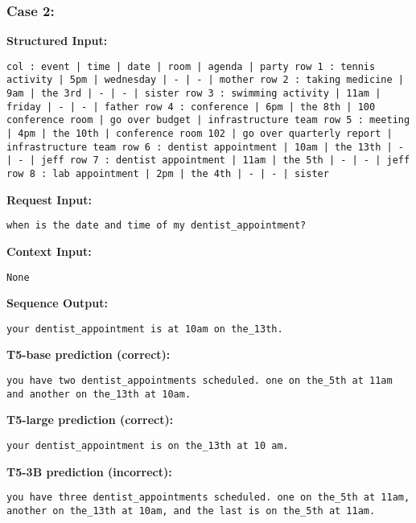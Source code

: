 \documentclass[11pt]{article}
\begin{document}
\subsubsection{Case 2:}
\label{app:kvret_case2}
\textbf{Structured Input:} 
\begin{lstlisting}
col : event | time | date | room | agenda | party row 1 : tennis activity | 5pm | wednesday | - | - | mother row 2 : taking medicine | 9am | the 3rd | - | - | sister row 3 : swimming activity | 11am | friday | - | - | father row 4 : conference | 6pm | the 8th | 100 conference room | go over budget | infrastructure team row 5 : meeting | 4pm | the 10th | conference room 102 | go over quarterly report | infrastructure team row 6 : dentist appointment | 10am | the 13th | - | - | jeff row 7 : dentist appointment | 11am | the 5th | - | - | jeff row 8 : lab appointment | 2pm | the 4th | - | - | sister
\end{lstlisting}
\textbf{Request Input:} 
\begin{lstlisting}
when is the date and time of my dentist_appointment?
\end{lstlisting}
\textbf{Context Input:} 
\begin{lstlisting}
None 
\end{lstlisting}
\textbf{Sequence Output:} 
\begin{lstlisting}
your dentist_appointment is at 10am on the_13th.
\end{lstlisting}
\textbf{T5-base prediction (correct):} 
\begin{lstlisting}
you have two dentist_appointments scheduled. one on the_5th at 11am and another on the_13th at 10am.
\end{lstlisting}
\textbf{T5-large prediction (correct):} 
\begin{lstlisting}
your dentist_appointment is on the_13th at 10 am.
\end{lstlisting}
\textbf{T5-3B prediction (incorrect):} 
\begin{lstlisting}
you have three dentist_appointments scheduled. one on the_5th at 11am, another on the_13th at 10am, and the last is on the_5th at 11am.
\end{lstlisting}
\end{document}

